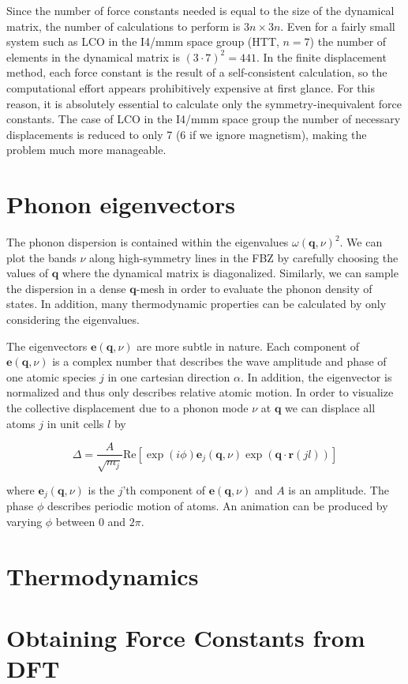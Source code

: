Since the number of force constants needed is equal to the size of the dynamical matrix, the number of calculations to perform is $3n \times 3n$. Even for a fairly small system such as LCO in the I4/mmm space group (HTT, $n=7$) the number of elements in the dynamical matrix is $(3\cdot 7)^2 = 441$. In the finite displacement method, each force constant is the result of a self-consistent calculation, so the computational effort appears prohibitively expensive at first glance. For this reason, it is absolutely essential to calculate only the symmetry-inequivalent force constants. The case of LCO in the I4/mmm space group the number of necessary displacements is reduced to only 7 (6 if we ignore magnetism), making the problem much more manageable.

\section{Phonon eigenvectors}
The phonon dispersion is contained within the eigenvalues $\omega (\bm{q},\nu)^2$. We can plot the bands $\nu$ along high-symmetry lines in the FBZ by carefully choosing the values of $\bm{q}$ where the dynamical matrix is diagonalized. Similarly, we can sample the dispersion in a dense $\bm{q}$-mesh in order to evaluate the phonon density of states. In addition, many thermodynamic properties can be calculated by only considering the eigenvalues.

The eigenvectors $\bm{e}(\bm{q}, \nu)$ are more subtle in nature. Each component of  $\bm{e}(\bm{q}, \nu)$ is a complex number that describes the wave amplitude and phase of one atomic species $j$ in one cartesian direction $\alpha$. In addition, the eigenvector is normalized and thus only describes relative atomic motion. In order to visualize the collective displacement due to a phonon mode $\nu$ at $\bm{q}$ we can displace all atoms $j$ in unit cells $l$ by

\[ \Delta = \frac{A}{\sqrt{m_j}} \text{Re} \left[ \exp(i\phi) \bm{e}_j(\bm{q}, \nu) \exp (\bm{q} \cdot \bm{r}(jl)) \right] \]

\noindent where $\bm{e}_j(\bm{q}, \nu)$ is the $j$'th component of $\bm{e}(\bm{q}, \nu)$ and $A$ is an amplitude. The phase $\phi$ describes periodic motion of atoms. An animation can be produced by varying $\phi$ between 0 and $2 \pi$.

\section{Thermodynamics}

\section{Obtaining Force Constants from DFT}








